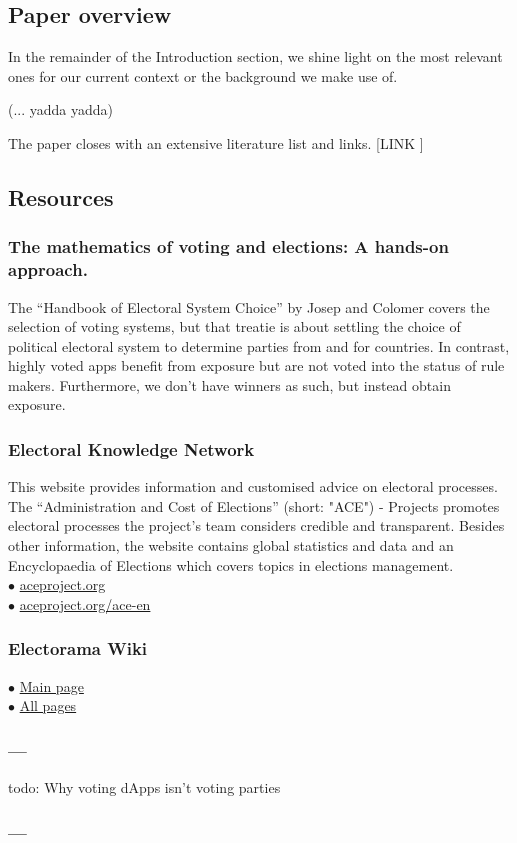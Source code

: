 
\subsection{Paper overview}

In the remainder of the Introduction section, we shine light on the most relevant ones for our current context or the background we make use of.

(... yadda yadda)

The paper closes with an extensive literature list and links. [LINK ]

\subsection{Resources} 

\subsubsection{The mathematics of voting and elections: A hands-on approach.}
The ``Handbook of Electoral System Choice'' by Josep and Colomer covers the selection of voting systems, but that treatie is about settling the choice of political electoral system to determine parties from and for countries. In contrast, highly voted apps benefit from exposure but are not voted into the status of rule makers.
Furthermore, we don't have winners as such, but instead obtain exposure.

\subsubsection{Electoral Knowledge Network} 
This website provides information and customised advice on electoral processes. 
The ``Administration and Cost of Elections'' (short: "ACE") - Projects promotes electoral processes the project's team considers credible and transparent. 
Besides other information, the website contains global statistics and data and an Encyclopaedia of Elections which covers topics in elections management. \\
$\bullet$ \href{http://www.aceproject.org/}{aceproject.org}\\
$\bullet$ \href{http://aceproject.org/ace-en}{aceproject.org/ace-en}

\subsubsection{Electorama Wiki} 
$\bullet$ \href{https://wiki.electorama.com}{Main page}\\
$\bullet$ \href{hhttps://wiki.electorama.com/wiki/Special:AllPages}{All pages}

\subsubsection{---} 
{todo: Why voting dApps isn't voting parties}

\subsubsection{---} 